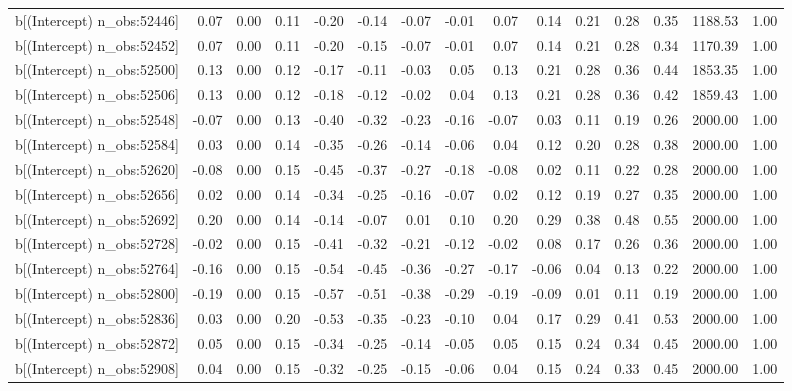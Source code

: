 \begin{table}[ht]
\begin{tabular}{rrrrrrrrrrrrrrr}
  b[(Intercept) n\_obs:52446] & 0.07 & 0.00 & 0.11 & -0.20 & -0.14 & -0.07 & -0.01 & 0.07 & 0.14 & 0.21 & 0.28 & 0.35 & 1188.53 & 1.00 \\ 
  b[(Intercept) n\_obs:52452] & 0.07 & 0.00 & 0.11 & -0.20 & -0.15 & -0.07 & -0.01 & 0.07 & 0.14 & 0.21 & 0.28 & 0.34 & 1170.39 & 1.00 \\ 
  b[(Intercept) n\_obs:52500] & 0.13 & 0.00 & 0.12 & -0.17 & -0.11 & -0.03 & 0.05 & 0.13 & 0.21 & 0.28 & 0.36 & 0.44 & 1853.35 & 1.00 \\ 
  b[(Intercept) n\_obs:52506] & 0.13 & 0.00 & 0.12 & -0.18 & -0.12 & -0.02 & 0.04 & 0.13 & 0.21 & 0.28 & 0.36 & 0.42 & 1859.43 & 1.00 \\ 
  b[(Intercept) n\_obs:52548] & -0.07 & 0.00 & 0.13 & -0.40 & -0.32 & -0.23 & -0.16 & -0.07 & 0.03 & 0.11 & 0.19 & 0.26 & 2000.00 & 1.00 \\ 
  b[(Intercept) n\_obs:52584] & 0.03 & 0.00 & 0.14 & -0.35 & -0.26 & -0.14 & -0.06 & 0.04 & 0.12 & 0.20 & 0.28 & 0.38 & 2000.00 & 1.00 \\ 
  b[(Intercept) n\_obs:52620] & -0.08 & 0.00 & 0.15 & -0.45 & -0.37 & -0.27 & -0.18 & -0.08 & 0.02 & 0.11 & 0.22 & 0.28 & 2000.00 & 1.00 \\ 
  b[(Intercept) n\_obs:52656] & 0.02 & 0.00 & 0.14 & -0.34 & -0.25 & -0.16 & -0.07 & 0.02 & 0.12 & 0.19 & 0.27 & 0.35 & 2000.00 & 1.00 \\ 
  b[(Intercept) n\_obs:52692] & 0.20 & 0.00 & 0.14 & -0.14 & -0.07 & 0.01 & 0.10 & 0.20 & 0.29 & 0.38 & 0.48 & 0.55 & 2000.00 & 1.00 \\ 
  b[(Intercept) n\_obs:52728] & -0.02 & 0.00 & 0.15 & -0.41 & -0.32 & -0.21 & -0.12 & -0.02 & 0.08 & 0.17 & 0.26 & 0.36 & 2000.00 & 1.00 \\ 
  b[(Intercept) n\_obs:52764] & -0.16 & 0.00 & 0.15 & -0.54 & -0.45 & -0.36 & -0.27 & -0.17 & -0.06 & 0.04 & 0.13 & 0.22 & 2000.00 & 1.00 \\ 
  b[(Intercept) n\_obs:52800] & -0.19 & 0.00 & 0.15 & -0.57 & -0.51 & -0.38 & -0.29 & -0.19 & -0.09 & 0.01 & 0.11 & 0.19 & 2000.00 & 1.00 \\ 
  b[(Intercept) n\_obs:52836] & 0.03 & 0.00 & 0.20 & -0.53 & -0.35 & -0.23 & -0.10 & 0.04 & 0.17 & 0.29 & 0.41 & 0.53 & 2000.00 & 1.00 \\ 
  b[(Intercept) n\_obs:52872] & 0.05 & 0.00 & 0.15 & -0.34 & -0.25 & -0.14 & -0.05 & 0.05 & 0.15 & 0.24 & 0.34 & 0.45 & 2000.00 & 1.00 \\ 
  b[(Intercept) n\_obs:52908] & 0.04 & 0.00 & 0.15 & -0.32 & -0.25 & -0.15 & -0.06 & 0.04 & 0.15 & 0.24 & 0.33 & 0.45 & 2000.00 & 1.00 \\ 

\end{tabular}
\end{table}
